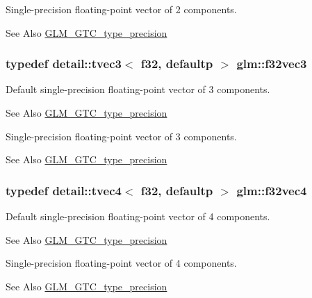 Single-\/precision floating-\/point vector of 2 components. \begin{DoxySeeAlso}{See Also}
\hyperlink{group__gtc__type__precision}{G\-L\-M\-\_\-\-G\-T\-C\-\_\-type\-\_\-precision} 
\end{DoxySeeAlso}
\hypertarget{group__gtc__type__precision_ga9b74939fb3bdd450be65f798037dd79d}{
\subsubsection[{f32vec3}]{\setlength{\rightskip}{0pt plus 5cm}typedef detail\-::tvec3$<$ f32, defaultp $>$ {\bf glm\-::f32vec3}}}\label{group__gtc__type__precision_ga9b74939fb3bdd450be65f798037dd79d}
Default single-\/precision floating-\/point vector of 3 components. \begin{DoxySeeAlso}{See Also}
\hyperlink{group__gtc__type__precision}{G\-L\-M\-\_\-\-G\-T\-C\-\_\-type\-\_\-precision}
\end{DoxySeeAlso}
Single-\/precision floating-\/point vector of 3 components. \begin{DoxySeeAlso}{See Also}
\hyperlink{group__gtc__type__precision}{G\-L\-M\-\_\-\-G\-T\-C\-\_\-type\-\_\-precision} 
\end{DoxySeeAlso}
\hypertarget{group__gtc__type__precision_gab6254ab9d409cce6579d7dc75dd34114}{
\subsubsection[{f32vec4}]{\setlength{\rightskip}{0pt plus 5cm}typedef detail\-::tvec4$<$ f32, defaultp $>$ {\bf glm\-::f32vec4}}}\label{group__gtc__type__precision_gab6254ab9d409cce6579d7dc75dd34114}
Default single-\/precision floating-\/point vector of 4 components. \begin{DoxySeeAlso}{See Also}
\hyperlink{group__gtc__type__precision}{G\-L\-M\-\_\-\-G\-T\-C\-\_\-type\-\_\-precision}
\end{DoxySeeAlso}
Single-\/precision floating-\/point vector of 4 components. \begin{DoxySeeAlso}{See Also}
\hyperlink{group__gtc__type__precision}{G\-L\-M\-\_\-\-G\-T\-C\-\_\-type\-\_\-precision} 
\end{DoxySeeAlso}
